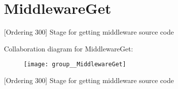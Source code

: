 \hypertarget{group__MiddlewareGet}{\section{Middleware\-Get}
\label{group__MiddlewareGet}
}


\mbox{[}Ordering 300\mbox{]} Stage for getting middleware source code  


Collaboration diagram for Middleware\-Get\-:\nopagebreak
\begin{figure}[H]
\begin{center}
\leavevmode
\texttt{[image: group\_\_MiddlewareGet]}
\end{center}
\end{figure}
\mbox{[}Ordering 300\mbox{]} Stage for getting middleware source code 